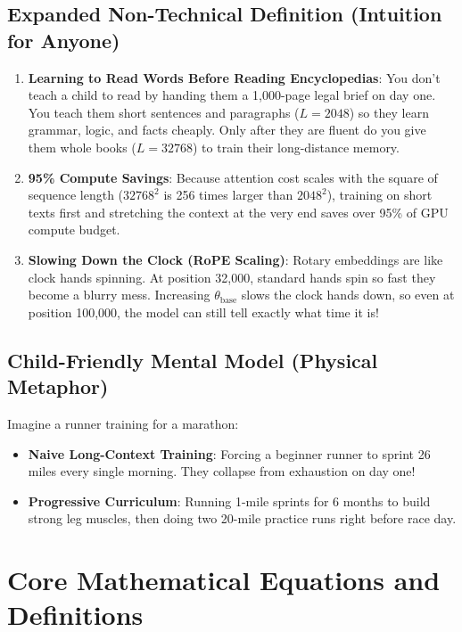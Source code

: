 \documentclass[11pt,a4paper]{article}
\theoremstyle{definition}
\begin{document}
\subsection{Expanded Non-Technical Definition (Intuition for Anyone)}
\begin{enumerate}
    \item \textbf{Learning to Read Words Before Reading Encyclopedias}: You don't teach a child to read by handing them a 1,000-page legal brief on day one. You teach them short sentences and paragraphs ($L=2048$) so they learn grammar, logic, and facts cheaply. Only after they are fluent do you give them whole books ($L=32768$) to train their long-distance memory.
    \item \textbf{95\% Compute Savings}: Because attention cost scales with the square of sequence length ($32768^2$ is 256 times larger than $2048^2$), training on short texts first and stretching the context at the very end saves over 95\% of GPU compute budget.
    \item \textbf{Slowing Down the Clock (RoPE Scaling)}: Rotary embeddings are like clock hands spinning. At position 32,000, standard hands spin so fast they become a blurry mess. Increasing $\theta_{\text{base}}$ slows the clock hands down, so even at position 100,000, the model can still tell exactly what time it is!
\end{enumerate}

\subsection{Child-Friendly Mental Model (Physical Metaphor)}
Imagine a runner training for a marathon:
\begin{itemize}
    \item \textbf{Naive Long-Context Training}: Forcing a beginner runner to sprint 26 miles every single morning. They collapse from exhaustion on day one!
    \item \textbf{Progressive Curriculum}: Running 1-mile sprints for 6 months to build strong leg muscles, then doing two 20-mile practice runs right before race day.
\end{itemize}

\section{Core Mathematical Equations and Definitions}
\end{document}
